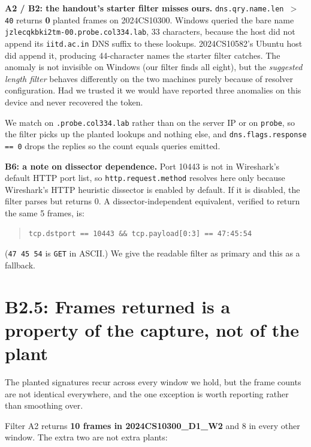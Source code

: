 \textbf{A2 / B2: the handout's starter filter misses ours.} \texttt{dns.qry.name.len $>$ 40}
returns \textbf{0} planted frames on 2024CS10300. Windows queried the bare name
\texttt{jzlecqkbki2tm-00.probe.col334.lab}, 33 characters, because the host did not append its
\texttt{iitd.ac.in} DNS suffix to these lookups. 2024CS10582's Ubuntu host did append it,
producing 44-character names the starter filter catches. The anomaly is not invisible on Windows
(our filter finds all eight), but the \emph{suggested length filter} behaves differently on
the two machines purely because of resolver configuration. Had we trusted it we would have
reported three anomalies on this device and never recovered the token.

We match on \texttt{.probe.col334.lab} rather than on the server IP or on \texttt{probe}, so the
filter picks up the planted lookups and nothing else, and \texttt{dns.flags.response == 0} drops
the replies so the count equals queries emitted.

\textbf{B6: a note on dissector dependence.} Port 10443 is not in Wireshark's default HTTP
port list, so \texttt{http.request.method} resolves here only because Wireshark's HTTP heuristic
dissector is enabled by default. If it is disabled, the filter parses but returns 0. A
dissector-independent equivalent, verified to return the same 5 frames, is:

\begin{quote}\ttfamily\footnotesize
\begin{verbatim}
tcp.dstport == 10443 && tcp.payload[0:3] == 47:45:54
\end{verbatim}
\end{quote}

\noindent(\texttt{47 45 54} is \texttt{GET} in ASCII.) We give the readable filter as primary and
this as a fallback.

\section{B2.5: Frames returned is a property of the capture, not of the plant}

The planted signatures recur across every window we hold, but the frame counts are not identical
everywhere, and the one exception is worth reporting rather than smoothing over.

Filter A2 returns \textbf{10 frames in 2024CS10300\_D1\_W2} and 8 in every other window. The
extra two are not extra plants:

